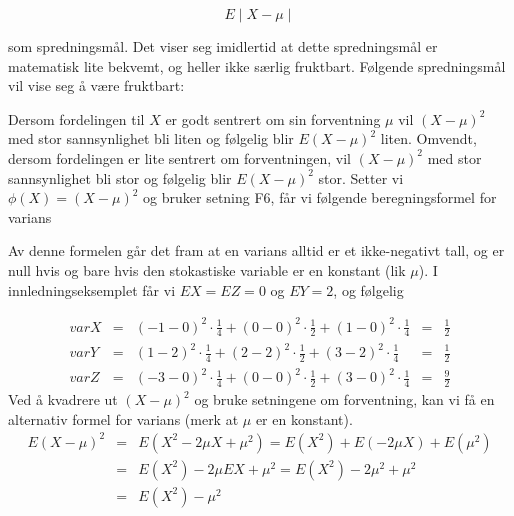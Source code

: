 \[    E \mid X - \mu \mid   \]

\noindent som spredningsmål. Det viser seg imidlertid at dette
spredningsmål er matematisk lite bekvemt, og heller ikke særlig
fruktbart.
Følgende spredningsmål vil vise seg å være fruktbart:

\begin{center}  \end{center}

\noindent Dersom fordelingen til $X$ er godt sentrert om sin forventning
$\mu$ vil $(X - \mu)^2$ med stor sannsynlighet bli liten og
følgelig blir $E(X - \mu)^2$ liten. Omvendt, dersom fordelingen
er lite sentrert om forventningen, vil $(X - \mu)^2$ med stor
sannsynlighet bli stor og følgelig blir $E(X - \mu)^2$ stor.
Setter vi $\phi(X)=(X - \mu)^2$ og bruker setning F6, får vi
følgende beregningsformel for varians

\begin{center} \framebox[10cm]{\begin{minipage}{9cm}\rule{0cm}{0.5cm}
\[ \mbox{\ \ \ V2. \ \ \ \ }   varX = \sum_{x}{(x-\mu)}^2p(x) \]
\mbox{}  \end{minipage}} \end{center}

\noindent Av denne formelen går det fram at en varians alltid er et
ikke-negativt tall, og er null hvis og bare hvis den stokastiske
variable er en konstant (lik $\mu$).
I innledningseksemplet får vi $EX=EZ=0$ og $EY=2$, og følgelig

\[ \begin{array}{ccccc}
    varX&=&{(-1-0)}^2 \cdot \frac{1}{4}+{(0-0)}^2 \cdot \frac{1}{2}+
                   {(1-0)}^2 \cdot \frac{1}{4}&=&\frac{1}{2} \\
    varY&=&{(1-2)}^2 \cdot \frac{1}{4}+{(2-2)}^2 \cdot \frac{1}{2}+
                   {(3-2)}^2 \cdot \frac{1}{4}&=&\frac{1}{2} \\
    varZ&=&{(-3-0)}^2 \cdot \frac{1}{4}+{(0-0)}^2 \cdot \frac{1}{2}+
                   {(3-0)}^2 \cdot \frac{1}{4}&=&\frac{9}{2} 
\end{array} \]
Ved å kvadrere ut $(X - \mu)^2$ og bruke setningene om forventning,
kan vi få en alternativ formel for varians (merk at $\mu$ er en
konstant).
\begin{eqnarray*}
E(X - \mu)^2 &=&E(X^2-2 \mu X+{\mu}^2)=E(X^2)+E(-2 \mu X)+E({\mu}^2) \\
             &=&E(X^2)-2\mu EX+{\mu}^2=E(X^2)-2{\mu}^2+{\mu}^2 \\
             &=&E(X^2)-{\mu}^2
\end{eqnarray*}

